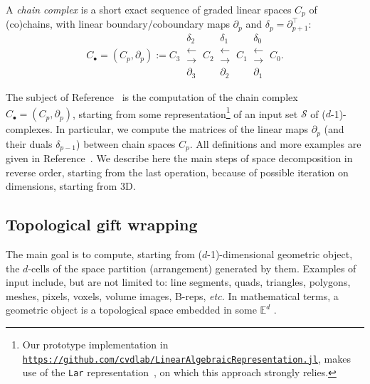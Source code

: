 \documentclass{juliacon}
\def\E{\mathbb{E}}
\begin{document}
A \emph{chain complex} is a short exact sequence of graded linear spaces \(C_p\) of (co)chains, with linear
boundary/coboundary maps \(\partial_p\) and
\(\delta_p=\partial_{p+1}^\top\): 
\[ 
C_\bullet = (C_p, \partial_p) := 
C_3 \ 
\substack{
\delta_2 \\
\longleftarrow \\[-1mm]
\longrightarrow \\
\partial_3 
}
\ C_2 \ 
\substack{
\delta_1 \\
\longleftarrow \\[-1mm]
\longrightarrow \\
\partial_2 
}
\ C_1 \ 
\substack{
\delta_0 \\
\longleftarrow \\[-1mm]
\longrightarrow \\
\partial_1 
}
\ C_0 .
\] 

The subject of Reference~\cite{TSAS:17} is the computation of the chain complex $C_\bullet = (C_p,\partial_p)$, starting from some representation\footnote{Our prototype implementation in\\ \href{https://github.com/cvdlab/LinearAlgebraicRepresentation.jl}{\scriptsize \texttt{https://github.com/cvdlab/LinearAlgebraicRepresentation.jl}}, makes use of the \texttt{Lar} representation~\cite{Dicarlo:2014:TNL:2543138.2543294}, on which this approach strongly relies.} of an input set $\mathcal{S}$ of ($d$-1)-complexes. In particular, we compute the matrices of the linear maps $\partial_p$ (and their duals $\delta_{p-1}$)  between chain spaces $C_p$. All definitions and more examples are given in Reference~\cite{TSAS:17}. We describe here the main steps of space decomposition in reverse order, starting from the last operation, because of possible iteration on dimensions, starting from 3D.


\subsection{Topological gift wrapping}
The main goal is to compute, starting from ($d$-1)-dimensional geometric object, the $d$-cells of the space partition (arrangement) generated by them. Examples of input include, but are not limited to: line segments, quads, triangles, polygons, meshes, pixels, voxels, volume images, B-reps, \emph{etc.} 
In mathematical terms, a geometric object is a topological space embedded in some $\E^d$ .
\end{document}
